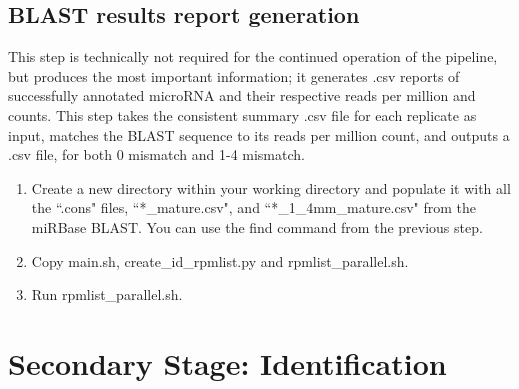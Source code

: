 \documentclass[12pt,titlepage]{article}
\begin{document}
\subsection{BLAST results report generation}
This step is technically not required for the continued operation of the pipeline, but produces the most important information; it generates .csv reports of successfully annotated microRNA and their respective reads per million and counts. This step takes the consistent summary .csv file for each replicate as input, matches the BLAST sequence to its reads per million count, and outputs a .csv file, for both 0 mismatch and 1-4 mismatch.
\begin{enumerate}
\item Create a new directory within your working directory and populate it with all the ``.cons" files, ``*\_mature.csv", and ``*\_1\_4mm\_mature.csv" from the miRBase BLAST. You can use the find command from the previous step.
\item Copy main.sh, create\_id\_rpmlist.py and rpmlist\_parallel.sh.
\item Run rpmlist\_parallel.sh.
\end{enumerate}

\section{Secondary Stage: Identification}
\end{document}
